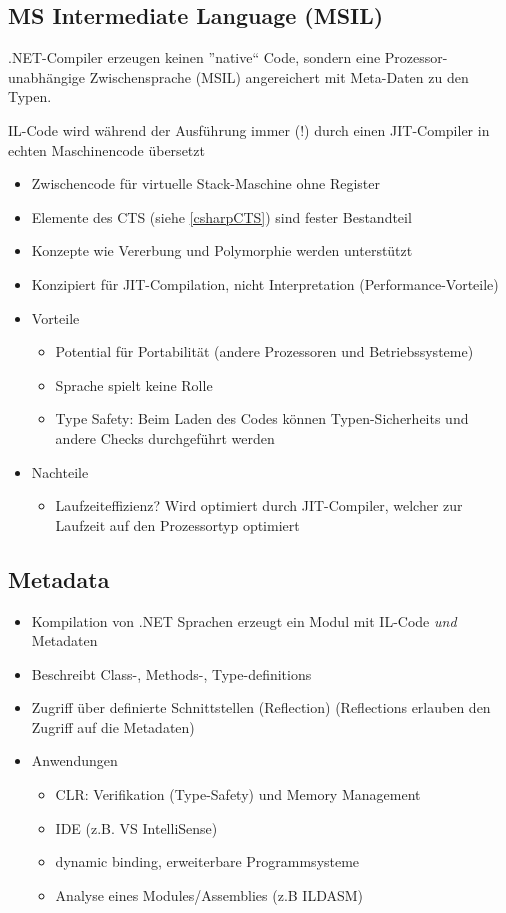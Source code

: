 \subsection{MS Intermediate Language (MSIL)}
.NET-Compiler erzeugen keinen ''native`` Code, sondern eine
Prozessor-unabhängige Zwischensprache (MSIL) angereichert mit
Meta-Daten zu den Typen.

IL-Code wird während der Ausführung immer (!) durch einen JIT-Compiler
in echten Maschinencode übersetzt

\begin{itemize}
	\item Zwischencode für virtuelle Stack-Maschine ohne Register
	\item Elemente des CTS (siehe \ref{csharpCTS}) sind fester Bestandteil
	\item Konzepte wie Vererbung und Polymorphie werden unterstützt
	\item Konzipiert für JIT-Compilation, nicht Interpretation (Performance-Vorteile)
	\item Vorteile
		\begin{itemize}
			\item Potential für Portabilität (andere Prozessoren und Betriebssysteme)
			\item Sprache spielt keine Rolle
			\item Type Safety: Beim Laden des Codes können Typen-Sicherheits und andere Checks durchgeführt werden
		\end{itemize}
	\item Nachteile
		\begin{itemize}
			\item Laufzeiteffizienz? Wird optimiert durch JIT-Compiler, welcher zur Laufzeit auf den Prozessortyp optimiert
		\end{itemize}

\end{itemize}

\subsection{Metadata}
\begin{itemize}
	\item Kompilation von .NET Sprachen erzeugt ein Modul mit IL-Code \emph{und} Metadaten
	\item Beschreibt Class-, Methods-, Type-definitions
	\item Zugriff über definierte Schnittstellen (Reflection) \newline
	      (Reflections erlauben den Zugriff auf die Metadaten)
	\item Anwendungen
		\begin{itemize}
			\item CLR: Verifikation (Type-Safety) und Memory Management
			\item IDE (z.B. VS IntelliSense)
			\item dynamic binding, erweiterbare Programmsysteme
			\item Analyse eines Modules/Assemblies (z.B ILDASM)
		\end{itemize}
\end{itemize}

